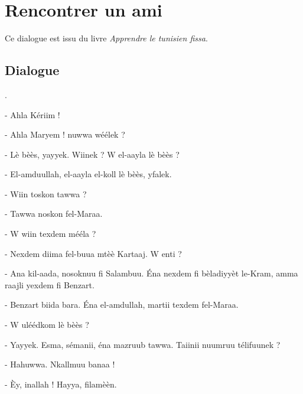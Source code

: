 \chapter{Rencontrer un ami}

Ce dialogue est issu du livre \textit{Apprendre le tunisien fissa}.

\section{Dialogue}
.\newline

- Ahla Kériim !

- Ahla Maryem ! \VS nuwwa \hb wéélek ? 

- Lè bèès, y\ca ayy\vs ek. Wiinek ? W el-\ca aayla lè bèès ?

- El-\hb amduullah, el-\ca aayla el-koll lè bèès, yfa\cdh \cdh lek.

- Wiin toskon tawwa ?

- Tawwa noskon fel-Mar\cs aa.

- W wiin texdem mééla ? 

- Nexdem diima fel-buu\cs \ct a mtèè\ca{} Kartaaj. W enti ? 

- A\hb na kil-\ca aada, nosoknuu fi Salambuu. Éna nexdem fi bèladiyyèt le-Kram, amma raajli yexdem fi Benzart.

- Benzart b\ca iida bar\vs a. Éna el-\hb amdullah, martii texdem fel-Mar\cs aa.

- W uléédkom lè bèès ? 

- Y\ca ayy\vs ek. Esma\ca, séma\hb nii, éna mazruub tawwa. Ta\ca\ct iinii nuumruu télifuunek ? 

- Hahuwwa. Nkallmuu b\ca a\cdh naa ! 

- Èy, in\vs allah ! Hayya, filamèèn.